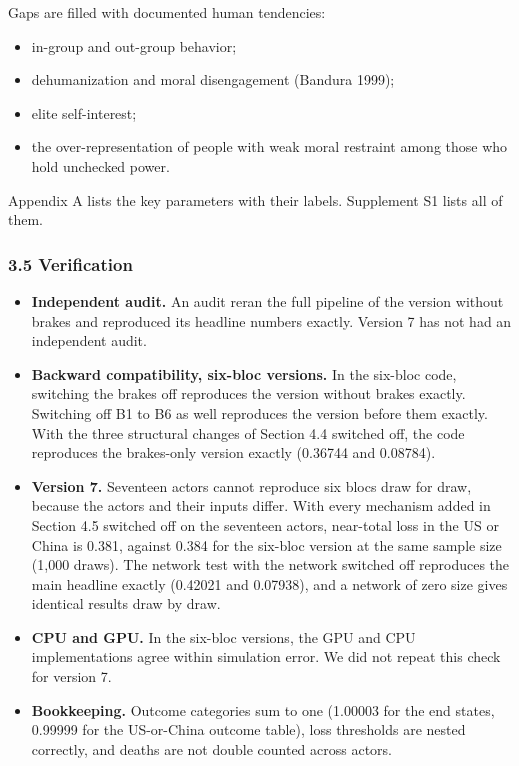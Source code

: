 \documentclass[
  10pt,
]{article}
\providecommand{\tightlist}{%
  \setlength{\itemsep}{0pt}\setlength{\parskip}{0pt}}
\begin{document}
Gaps are filled with documented human tendencies:

\begin{itemize}
\tightlist
\item
  in-group and out-group behavior;
\item
  dehumanization and moral disengagement (Bandura 1999);
\item
  elite self-interest;
\item
  the over-representation of people with weak moral restraint among those who hold unchecked power.
\end{itemize}

Appendix A lists the key parameters with their labels. Supplement S1 lists all of them.

\subsubsection{3.5 Verification}\label{verification}

\begin{itemize}
\tightlist
\item
  \textbf{Independent audit.} An audit reran the full pipeline of the version without brakes and
  reproduced its headline numbers exactly. Version 7 has not had an independent audit.
\item
  \textbf{Backward compatibility, six-bloc versions.} In the six-bloc code, switching the brakes off
  reproduces the version without brakes exactly. Switching off B1 to B6 as well reproduces the
  version before them exactly. With the three structural changes of Section 4.4 switched off, the
  code reproduces the brakes-only version exactly (0.36744 and 0.08784).
\item
  \textbf{Version 7.} Seventeen actors cannot reproduce six blocs draw for draw, because the actors
  and their inputs differ. With every mechanism added in Section 4.5 switched off on the seventeen
  actors, near-total loss in the US or China is 0.381, against 0.384 for the six-bloc version at the
  same sample size (1,000 draws). The network test with the network switched off reproduces the main
  headline exactly (0.42021 and 0.07938), and a network of zero size gives identical results draw by
  draw.
\item
  \textbf{CPU and GPU.} In the six-bloc versions, the GPU and CPU implementations agree within
  simulation error. We did not repeat this check for version 7.
\item
  \textbf{Bookkeeping.} Outcome categories sum to one (1.00003 for the end states, 0.99999 for the
  US-or-China outcome table), loss thresholds are nested correctly, and deaths are not double
  counted across actors.
\end{itemize}
\end{document}
